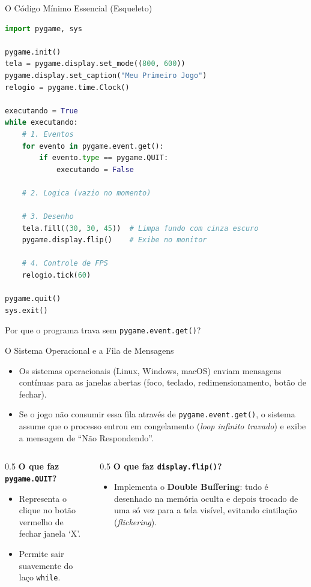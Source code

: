 \begin{frame}[fragile]{O Código Mínimo Essencial (Esqueleto)}
    \begin{lstlisting}[language=Python]
import pygame, sys

pygame.init()
tela = pygame.display.set_mode((800, 600))
pygame.display.set_caption("Meu Primeiro Jogo")
relogio = pygame.time.Clock()

executando = True
while executando:
    # 1. Eventos
    for evento in pygame.event.get():
        if evento.type == pygame.QUIT:
            executando = False

    # 2. Logica (vazio no momento)

    # 3. Desenho
    tela.fill((30, 30, 45))  # Limpa fundo com cinza escuro
    pygame.display.flip()    # Exibe no monitor

    # 4. Controle de FPS
    relogio.tick(60)

pygame.quit()
sys.exit()
    \end{lstlisting}
\end{frame}

\begin{frame}{Por que o programa trava sem \texttt{pygame.event.get()}?}
    \begin{block}{O Sistema Operacional e a Fila de Mensagens}
        \begin{itemize}
            \item Os sistemas operacionais (Linux, Windows, macOS) enviam mensagens contínuas para as janelas abertas (foco, teclado, redimensionamento, botão de fechar).
            \item Se o jogo não consumir essa fila através de \texttt{pygame.event.get()}, o sistema assume que o processo entrou em congelamento (\textit{loop infinito travado}) e exibe a mensagem de ``Não Respondendo''.
        \end{itemize}
    \end{block}

    \vspace{0.3cm}
    \begin{columns}
        \begin{column}{0.5\textwidth}
            \textbf{O que faz \texttt{pygame.QUIT}?}
            \begin{itemize}
                \item Representa o clique no botão vermelho de fechar janela `X'.
                \item Permite sair suavemente do laço \texttt{while}.
            \end{itemize}
        \end{column}
        \begin{column}{0.5\textwidth}
            \textbf{O que faz \texttt{display.flip()}?}
            \begin{itemize}
                \item Implementa o \textbf{Double Buffering}: tudo é desenhado na memória oculta e depois trocado de uma só vez para a tela visível, evitando cintilação (\textit{flickering}).
            \end{itemize}
        \end{column}
    \end{columns}
\end{frame}
